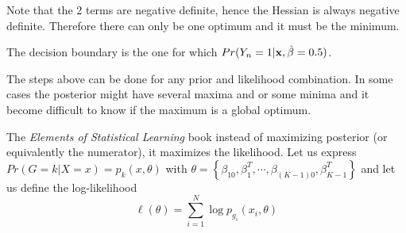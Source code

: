 Note that the 2 terms are negative definite, hence the Hessian is always negative definite. Therefore there can only be one optimum and it must be the minimum.

The decision boundary is the one for which $Pr(Y_n=1|\mathbf{x},\hat{\mathbf{\beta}}=0.5)$.

The steps above can be done for any prior and likelihood combination. In some cases the posterior might have several maxima and or some minima and it become difficult to know if the maximum is a global optimum.


The \textit{Elements of Statistical Learning} book instead of maximizing posterior (or equivalently the numerator), it maximizes the likelihood.
Let us express $Pr\left(G=k|X=x\right)=p_k(x,\theta)$ with $\theta = \left\lbrace \beta_{10},\beta_1^T,\cdots, \beta_{\left(K-1\right)0},\beta_{K-1}^T\right\rbrace$
and let us define the log-likelihood
\begin{equation}
\ell(\theta) = \sum_{i=1}^N \log p_{g_i}\left(x_i, \theta\right)
\end{equation}

